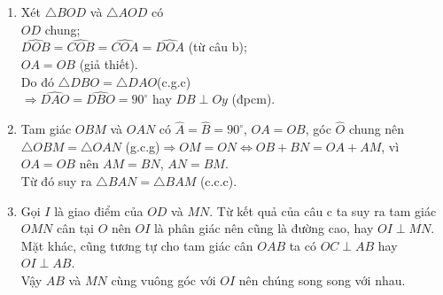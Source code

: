 \begin{ex}
{\begin{enumerate}
{\begin{tikzpicture}[scale=0.8, line join=round, line cap=round]
		\end{tikzpicture}
		}
		\item Xét $\triangle BOD$ và $\triangle AOD$ có \\
		$OD$ chung;\\
		$\widehat{DOB}=\widehat{COB}=\widehat{COA}=\widehat{DOA}$ (từ câu b);\\
		$OA=OB$ (giả thiết).\\
		Do đó $\triangle DBO=\triangle DAO$(c.g.c)\\
		$\Rightarrow \widehat{DAO}=\widehat{DBO}=90^\circ$ hay $DB\perp Oy$ (đpcm). 
		\item Tam giác $OBM$ và $OAN$ có $\widehat{A}=\widehat{B}=90^\circ$, $OA=OB$, góc $\widehat{O}$ chung nên $\triangle OBM=\triangle OAN$ (g.c.g)$\Rightarrow OM=ON\Leftrightarrow OB+BN=OA+AM$, vì $OA=OB$ nên $AM=BN$, $AN=BM$.\\
		Từ đó suy ra $\triangle BAN=\triangle BAM$ (c.c.c). 
		\item Gọi $I$ là giao điểm của $OD$ và $MN$. Từ kết quả của câu c ta suy ra tam giác $OMN$ cân tại $O$ nên $OI$ là phân giác nên cũng là đường cao, hay $OI\perp MN$.\\
		Mặt khác, cũng tương tự cho tam giác cân $OAB$ ta có $OC\perp AB$ hay $OI\perp AB$. \\
		Vậy $AB$ và $MN$ cùng vuông góc với $OI$ nên chúng song song với nhau. 
	\end{enumerate}
	}
\end{ex}
